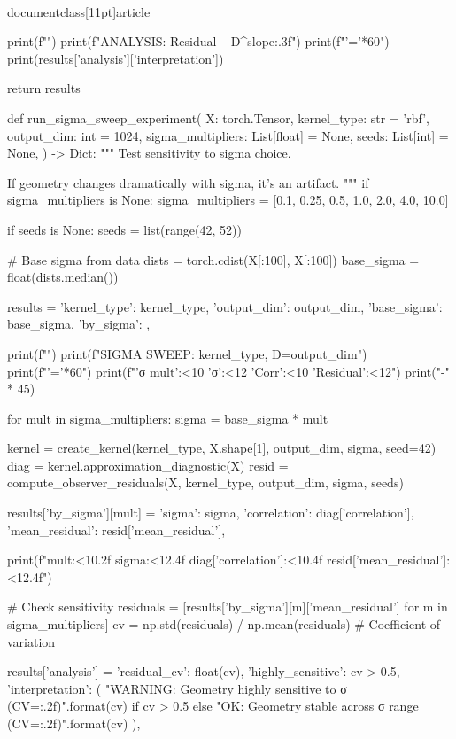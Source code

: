 \\documentclass[11pt]{article}
\begin{document}
\begin{CodeBlock}
    print(f"")
    print(f"ANALYSIS: Residual ~ D^{slope:.3f}")
    print(f"{'='*60}")
    print(results['analysis']['interpretation'])
    
    return results


def run_sigma_sweep_experiment(
    X: torch.Tensor,
    kernel_type: str = 'rbf',
    output_dim: int = 1024,
    sigma_multipliers: List[float] = None,
    seeds: List[int] = None,
) -> Dict:
    """
    Test sensitivity to sigma choice.
    
    If geometry changes dramatically with sigma, it's an artifact.
    """
    if sigma_multipliers is None:
        sigma_multipliers = [0.1, 0.25, 0.5, 1.0, 2.0, 4.0, 10.0]
    
    if seeds is None:
        seeds = list(range(42, 52))
    
    # Base sigma from data
    dists = torch.cdist(X[:100], X[:100])
    base_sigma = float(dists.median())
    
    results = {
        'kernel_type': kernel_type,
        'output_dim': output_dim,
        'base_sigma': base_sigma,
        'by_sigma': {},
    }
    
    print(f"")
    print(f"SIGMA SWEEP: {kernel_type}, D={output_dim}")
    print(f"{'='*60}")
    print(f"{'σ mult':<10} {'σ':<12} {'Corr':<10} {'Residual':<12}")
    print("-" * 45)
    
    for mult in sigma_multipliers:
        sigma = base_sigma * mult
        
        kernel = create_kernel(kernel_type, X.shape[1], output_dim, sigma, seed=42)
        diag = kernel.approximation_diagnostic(X)
        resid = compute_observer_residuals(X, kernel_type, output_dim, sigma, seeds)
        
        results['by_sigma'][mult] = {
            'sigma': sigma,
            'correlation': diag['correlation'],
            'mean_residual': resid['mean_residual'],
        }
        
        print(f"{mult:<10.2f} {sigma:<12.4f} {diag['correlation']:<10.4f} {resid['mean_residual']:<12.4f}")
    
    # Check sensitivity
    residuals = [results['by_sigma'][m]['mean_residual'] for m in sigma_multipliers]
    cv = np.std(residuals) / np.mean(residuals)  # Coefficient of variation
    
    results['analysis'] = {
        'residual_cv': float(cv),
        'highly_sensitive': cv > 0.5,
        'interpretation': (
            "WARNING: Geometry highly sensitive to σ (CV={:.2f})".format(cv)
            if cv > 0.5 else
            "OK: Geometry stable across σ range (CV={:.2f})".format(cv)
        ),
    }
    

\end{CodeBlock}
\end{document}
